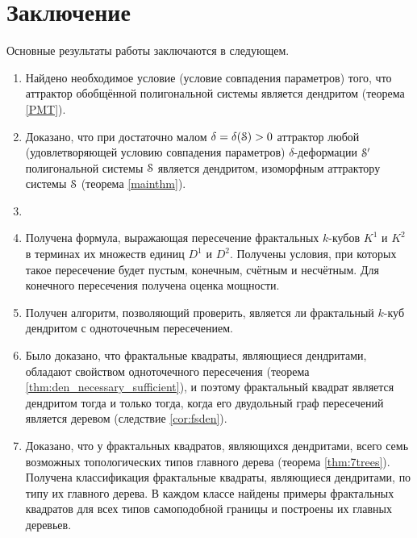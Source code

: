 \chapter*{Заключение}                       %


Основные результаты работы заключаются в следующем.

\begin{enumerate}
\item Найдено необходимое условие (условие совпадения параметров) того, что аттрактор обобщённой полигональной системы является дендритом (теорема \ref{PMT}). 

\item Доказано, что при достаточно малом $\delta=\delta({\EuScript S})>0$ аттрактор любой (удовлетворяющей условию совпадения параметров) $\delta$-деформации ${\EuScript S}'$  полигональной системы ${\EuScript S}$ является дендритом, изоморфным аттрактору системы ${\EuScript S}$ (теорема \ref{mainthm}).

\item 
\item Получена формула, выражающая пересечение фрактальных $k$-кубов $K^1$ и $K^2$ в терминах их множеств единиц $D^1$ и $D^2$.
Получены условия, при которых такое пересечение будет пустым, конечным, счётным и несчётным.
Для конечного пересечения получена оценка мощности.

\item Получен алгоритм, позволяющий проверить, является ли фрактальный $k$-куб дендритом с одноточечным пересечением.

\item Было доказано, что фрактальные квадраты, являющиеся дендритами, обладают свойством одноточечного пересечения (теорема \ref{thm:den_necessary_sufficient}), и поэтому фрактальный квадрат является дендритом тогда и только тогда, когда его двудольный граф пересечений является деревом (следствие \ref{cor:fsden}).

\item Доказано, что у фрактальных квадратов, являющихся дендритами, всего семь возможных топологических типов главного дерева (теорема \ref{thm:7trees}).
Получена классификация фрактальные квадраты, являющиеся дендритами, по типу их главного дерева.
В каждом классе найдены примеры фрактальных квадратов для всех типов самоподобной границы и построены их главных деревьев.
\end{enumerate}

